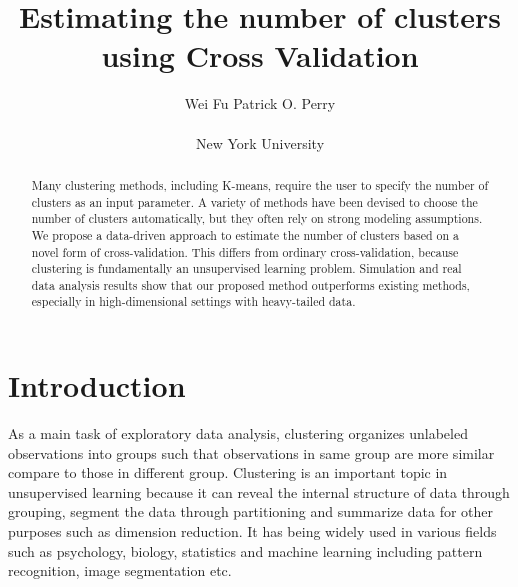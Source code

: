 \documentclass[11pt]{article}
\begin{document}
\title{Estimating the number of clusters using Cross Validation}
\author{Wei Fu \qquad Patrick O. Perry \\\\ New York University}
\date{}
\maketitle
\begin{abstract}
Many clustering methods, including K-means, require the user to specify the number of clusters as an input parameter. A variety of methods have been devised to choose the number of clusters automatically, but they often rely on strong modeling assumptions. We propose a data-driven approach to estimate the number of clusters based on a novel form of cross-validation. This differs from ordinary cross-validation, because clustering is fundamentally an unsupervised learning problem. Simulation and real data analysis results show that our proposed method outperforms existing methods, especially in high-dimensional settings with heavy-tailed data.
\end{abstract}

\section{Introduction}
As a main task of exploratory data analysis, clustering organizes unlabeled observations into groups such that observations in same group are more similar compare to those in different group. Clustering is an important topic in unsupervised learning because it can reveal the internal structure of data through grouping, segment the data through partitioning and summarize data for other purposes such as dimension reduction. It has being widely used in various fields such as psychology, biology, statistics and machine learning including pattern recognition, image segmentation etc.\\
\end{document}
